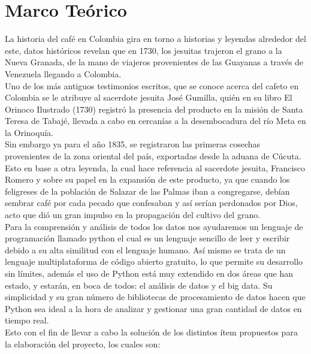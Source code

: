 \documentclass[11pt,letterpaper,twocolumn]{article}
\begin{document}
\section{Marco Teórico}
\justify
La historia del café en Colombia gira en torno a historias y leyendas alrededor del este, datos históricos revelan que en 1730, los jesuitas trajeron el grano a la Nueva Granada, de la mano de viajeros provenientes de las Guayanas a través de Venezuela llegando a Colombia.\\
Uno de los más antiguos testimonios escritos, que se conoce acerca del cafeto en Colombia se le atribuye al sacerdote jesuita José Gumilla, quién en su libro El Orinoco Ilustrado (1730) registró la presencia del producto en la misión de Santa Teresa de Tabajé, llevada a cabo en cercanías a la desembocadura del río Meta en la Orinoquía.\\
Sin embargo ya para el año 1835, se registraron las primeras cosechas provenientes de la zona oriental del país, exportadas desde la aduana de Cúcuta. Esto en base a otra  leyenda, la cual hace referencia al sacerdote jesuita, Francisco Romero y sobre su papel en la expansión de este producto, ya que cuando los feligreses de la población de Salazar de las Palmas iban a congregarse, debían sembrar café por cada pecado que confesaban y así serían perdonados por Dios, acto que dió un gran impulso en la propagación del cultivo del grano.\\
Para la comprensión y análisis de todos los datos nos ayudaremos un lenguaje de programación llamado python el cual es un lenguaje
sencillo de leer y escribir debido a su alta similitud con el lenguaje humano. Así mismo se trata de un lenguaje multiplataforma de código abierto gratuito, lo que permite su desarrollo sin límites, además el uso de Python está muy extendido en dos áreas que han estado, y estarán, en boca de todos: el análisis de datos y el big data. Su simplicidad y su gran número de bibliotecas de procesamiento de datos hacen que Python sea ideal a la hora de analizar y gestionar una gran cantidad de datos en tiempo real.\\
Esto con el fin de llevar a cabo la solución de  los distintos ítem propuestos para la elaboración del proyecto, los cuales son:\\
\end{document}
